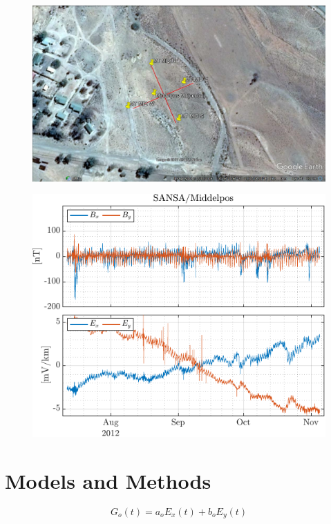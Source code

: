 \documentclass[draft,linenumbers]{agujournal2018}
\begin{document}
\begin{figure}[h]
  \centering
  \includegraphics[width=\textwidth]{figures/site.png}
  \caption{}
  \label{map}
\end{figure}

\begin{figure}[h]
  \centering
  \includegraphics[width=\textwidth]{figures/tsplot-original-Middelpos-tf1.pdf}
  \caption{}
  \label{map}
\end{figure}

\section{Models and Methods}
\label{section:Models_and_Methods}

\begin{linenomath*}
  \begin{equation}
    G_o(t) = a_oE_x(t) + b_oE_y(t)
    \label{model1}
  \end{equation}
\end{linenomath*}
\end{document}
